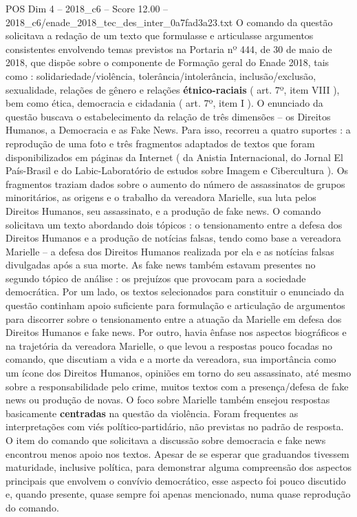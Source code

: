 \begin{textsample}{POS Dim 4 – 2018\_c6 – Score 12.00 – 2018\_c6/enade\_2018\_tec\_des\_inter\_0a7fad3a23.txt}
O comando da questão solicitava a redação de um texto que formulasse e articulasse argumentos consistentes envolvendo temas previstos na Portaria nº 444, de 30 de maio de 2018, que dispõe sobre o componente de Formação geral do Enade 2018, tais como : solidariedade/violência, tolerância/intolerância, inclusão/exclusão, sexualidade, relações de gênero e relações \textbf{étnico-raciais} ( art. 7º, item VIII ), bem como ética, democracia e cidadania ( art. 7º, item I ).
O enunciado da questão buscava o estabelecimento da relação de três dimensões – os Direitos Humanos, a Democracia e as Fake News.
Para isso, recorreu a quatro suportes : a reprodução de uma foto e três fragmentos adaptados de textos que foram disponibilizados em páginas da Internet ( da Anistia Internacional, do Jornal El País-Brasil e do Labic-Laboratório de estudos sobre Imagem e Cibercultura ).
Os fragmentos traziam dados sobre o aumento do número de assassinatos de grupos minoritários, as origens e o trabalho da vereadora Marielle, sua luta pelos Direitos Humanos, seu assassinato, e a produção de fake news.
O comando solicitava um texto abordando dois tópicos : o tensionamento entre a defesa dos Direitos Humanos e a produção de notícias falsas, tendo como base a vereadora Marielle – a defesa dos Direitos Humanos realizada por ela e as notícias falsas divulgadas após a sua morte.
As fake news também estavam presentes no segundo tópico de análise : os prejuízos que provocam para a sociedade democrática.
Por um lado, os textos selecionados para constituir o enunciado da questão continham apoio suficiente para formulação e articulação de argumentos para discorrer sobre o tensionamento entre a atuação da Marielle em defesa dos Direitos Humanos e fake news.
Por outro, havia ênfase nos aspectos biográficos e na trajetória da vereadora Marielle, o que levou a respostas pouco focadas no comando, que discutiam a vida e a morte da vereadora, sua importância como um ícone dos Direitos Humanos, opiniões em torno do seu assassinato, até mesmo sobre a responsabilidade pelo crime, muitos textos com a presença/defesa de fake news ou produção de novas.
O foco sobre Marielle também ensejou respostas basicamente \textbf{centradas} na questão da violência.
Foram frequentes as interpretações com viés político-partidário, não previstas no padrão de resposta.
O item do comando que solicitava a discussão sobre democracia e fake news encontrou menos apoio nos textos.
Apesar de se esperar que graduandos tivessem maturidade, inclusive política, para demonstrar alguma compreensão dos aspectos principais que envolvem o convívio democrático, esse aspecto foi pouco discutido e, quando presente, quase sempre foi apenas mencionado, numa quase reprodução do comando.

\end{textsample}
